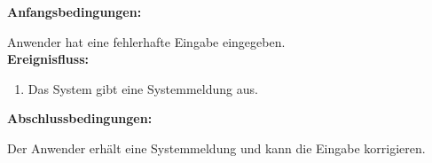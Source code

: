 \begin{itemize}
\textbf{Anfangsbedingungen:}

Anwender hat eine fehlerhafte Eingabe eingegeben.\\

\textbf{Ereignisfluss:}
\begin{enumerate}
\item Das System gibt eine Systemmeldung aus.
\end{enumerate}

\textbf{Abschlussbedingungen:}

Der Anwender erhält eine Systemmeldung und kann die Eingabe korrigieren.\\

\end{itemize}
